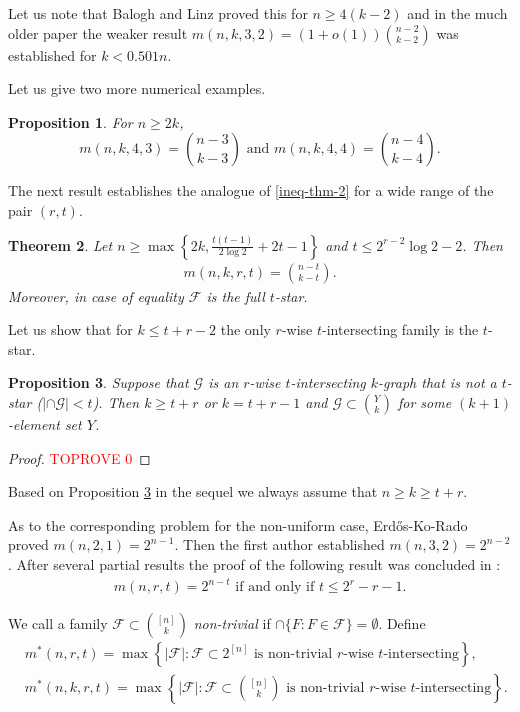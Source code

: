 \documentclass[11pt,a4paper]{article}
\newtheorem{thm}{Theorem}[section]
\newtheorem{prop}[thm]{Proposition}
\newtheorem{false statement}{False statement}
\theoremstyle{definition}
\def\hf{\mathcal{F}}
\def\hg{\mathcal{G}}
\begin{document}
 Let us note that Balogh and Linz \cite{BL} proved this for $n\geq 4(k-2)$ and in the much older paper \cite{FT}
 the weaker result $m(n,k,3,2) =(1+o(1)){n-2 \choose k-2}$ was established for $k<0.501 n$.

 Let us give two more numerical examples.

\begin{prop}\label{prop-main1}
For $n\geq 2k$,
\[
m(n,k,4,3) =\binom{n-3}{k-3}\mbox{ and } m(n,k,4,4) =\binom{n-4}{k-4}.
\]
\end{prop}


The next result establishes the analogue of \eqref{ineq-thm-2} for a wide range of the pair $(r,t)$.

\begin{thm}\label{thm:main-3}
Let $n\geq \max\left\{2k, \frac{t(t-1)}{2\log 2} +2t-1\right\}$ and $t\leq 2^{r-2}\log 2-2$.  Then
\begin{align}\label{ineq-5.2}
m(n,k,r,t) =\binom{n-t}{k-t}.
\end{align}
Moreover, in case of equality $\hf$ is the full $t$-star.
\end{thm}




Let us show that for $k\leq t+r-2$ the only $r$-wise $t$-intersecting family is the $t$-star.

\begin{prop}\label{prop-1.7}
Suppose that $\hg$ is an $r$-wise $t$-intersecting $k$-graph that is not a $t$-star ($|\cap \hg| <t$). Then $k\geq t+r$ or $k=t+r-1$ and $\hg\subset \binom{Y}{k}$ for some $(k+1)$-element set $Y$.
\end{prop}

\begin{proof}\textcolor{red}{TOPROVE 0}\end{proof}

Based on Proposition \ref{prop-1.7} in the sequel we always assume that $n\geq k\geq t+r$.

As to the corresponding problem for the non-uniform case, Erd\H{o}s-Ko-Rado \cite{ekr} proved $m(n,2,1)=2^{n-1}$. Then the first author \cite{F77Bulletin} established $m(n,3,2) = 2^{n-2}$. After several partial results  the proof of the following result was concluded in \cite{F19}:
\begin{align}\label{ineq-1.4}
 m(n,r,t) = 2^{n-t} \mbox{ if and only if } t\leq 2^r-r-1.
\end{align}


We call  a family $\hf\subset \binom{[n]}{k}$ {\it non-trivial} if $\cap \{F\colon F\in \hf\} =\emptyset$. Define
\begin{align*}
&m^*(n,r,t)= \max\left\{|\hf|\colon \hf\subset 2^{[n]} \mbox{ is non-trivial $r$-wise $t$-intersecting}\right\},\\[3pt]
&m^*(n,k,r,t)= \max\left\{|\hf|\colon \hf\subset \binom{[n]}{k} \mbox{ is non-trivial $r$-wise $t$-intersecting}\right\}.
\end{align*}
\end{document}
